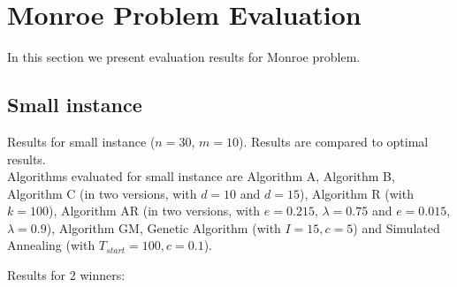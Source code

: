 \section{Monroe Problem Evaluation}

In this section we present evaluation results for Monroe problem.

\subsection{Small instance}

Results for small instance ($n = 30$, $m = 10$). Results are compared to optimal results.
\\

Algorithms evaluated for small instance are Algorithm A, Algorithm B, Algorithm C (in two versions, with $d = 10$ and $d = 15$), Algorithm R (with $k = 100$), Algorithm AR (in two versions, with $e = 0.215$, $\lambda = 0.75$ and $e = 0.015$, $\lambda = 0.9$), Algorithm GM, Genetic Algorithm (with $I = 15, c = 5$) and Simulated Annealing (with $T_{start} = 100, c = 0.1$).
\\

\newpage

Results for 2 winners:
\\

